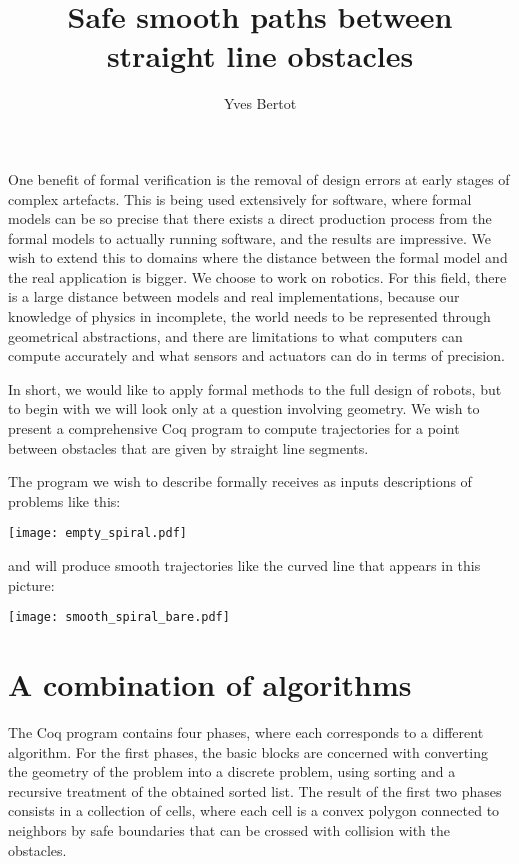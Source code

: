 \documentclass{easychair}
\title{Safe smooth paths between straight line obstacles}
\author{Yves Bertot}
\institute{Inria Université Côte d'Azur}
\begin{document}
\maketitle

One benefit of formal verification is the removal of design errors at early
stages of complex artefacts.  This is being used extensively for software,
where formal models can be so precise that there exists a direct production
process from the formal models to actually running software, and the results
are impressive.  We wish to
extend this to domains where the distance between the formal model and the
real application is bigger.  We choose to work on robotics.  For this
field, there is a large distance between models and real implementations,
because our knowledge of physics in incomplete,
the world needs to be represented through geometrical abstractions, and
there are limitations to what computers can compute accurately and what
sensors and actuators can do in terms of precision.

In short, we would like to apply formal methods to the full design of
robots, but to begin with
we will look only at a question involving geometry.  
We wish to present a comprehensive Coq program
to compute trajectories for a point between obstacles that are given by straight
line segments.

The program we wish to describe formally receives as inputs descriptions of problems like this:
\begin{center}
\texttt{[image: empty\_spiral.pdf]}
\end{center}
and will produce smooth trajectories like the curved line that appears in this
picture:
\begin{center}
\texttt{[image: smooth\_spiral\_bare.pdf]}
\end{center}


\section{A combination of algorithms}
The Coq program contains four phases, where each corresponds to a different
algorithm.  For the first phases, the basic blocks are concerned with
converting the geometry of the problem into a discrete problem, using sorting
and a recursive treatment of the obtained sorted list.  The result of the
first two phases consists in a collection of cells, where each cell is
a convex polygon connected to neighbors by safe boundaries that can
be crossed with collision with the obstacles.
\end{document}
